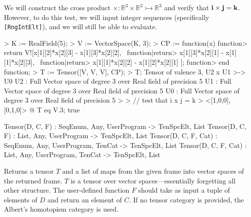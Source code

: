 \begin{example}[BBCrossProduct]

We will construct the cross product $\times : \mathbb{R}^3\times \mathbb{R}^3\rightarrowtail \mathbb{R}^3$ and verify that ${\bf i}\times {\bf j} = {\bf k}$.
However, to do this test, we will input integer sequences (specifically {\tt [RngIntElt]}), and we will still be able to evaluate.
\begin{code}
> K := RealField(5);
> V := VectorSpace(K, 3);
> CP := function(x)
function>   return V![x[1][2]*x[2][3] - x[1][3]*x[2][2], \
function|return>     x[1][3]*x[2][1] - x[1][1]*x[2][3], \
function|return>     x[1][1]*x[2][2] - x[1][2]*x[2][1] ];
function> end function;
> T := Tensor([V, V, V], CP);
> T;
Tensor of valence 3, U2 x U1 >-> U0
U2 : Full Vector space of degree 3 over Real field of precision 5
U1 : Full Vector space of degree 3 over Real field of precision 5
U0 : Full Vector space of degree 3 over Real field of precision 5
> 
> // test that i x j = k
> <[1,0,0], [0,1,0]> @ T eq V.3;
true
\end{code}
\end{example}

\begin{intrinsics}
Tensor(D, C, F) : SeqEnum, Any, UserProgram -> TenSpcElt, List
Tensor(D, C, F) : List, Any, UserProgram -> TenSpcElt, List
Tensor(D, C, F, Cat) : SeqEnum, Any, UserProgram, TenCat -> TenSpcElt, List
Tensor(D, C, F, Cat) : List, Any, UserProgram, TenCat -> TenSpcElt, List
\end{intrinsics}

Returns a tensor $T$ and a list of maps from the given frame into vector spaces of the returned frame.
$T$ is a tensor over vector spaces---essentially forgetting all other structure.
The user-defined function $F$ should take as input a tuple of elements of $D$ and return an element of $C$.
If no tensor category is provided, the Albert's homotopism category is used.

